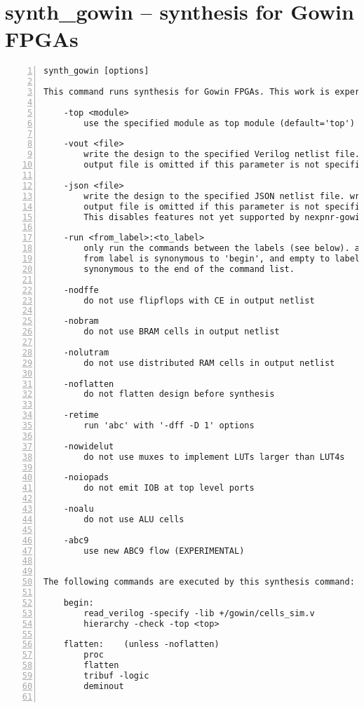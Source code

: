 \section{synth\_gowin -- synthesis for Gowin FPGAs}
\label{cmd:synth_gowin}
\begin{lstlisting}[numbers=left,frame=single]
    synth_gowin [options]

This command runs synthesis for Gowin FPGAs. This work is experimental.

    -top <module>
        use the specified module as top module (default='top')

    -vout <file>
        write the design to the specified Verilog netlist file. writing of an
        output file is omitted if this parameter is not specified.

    -json <file>
        write the design to the specified JSON netlist file. writing of an
        output file is omitted if this parameter is not specified.
        This disables features not yet supported by nexpnr-gowin.

    -run <from_label>:<to_label>
        only run the commands between the labels (see below). an empty
        from label is synonymous to 'begin', and empty to label is
        synonymous to the end of the command list.

    -nodffe
        do not use flipflops with CE in output netlist

    -nobram
        do not use BRAM cells in output netlist

    -nolutram
        do not use distributed RAM cells in output netlist

    -noflatten
        do not flatten design before synthesis

    -retime
        run 'abc' with '-dff -D 1' options

    -nowidelut
        do not use muxes to implement LUTs larger than LUT4s

    -noiopads
        do not emit IOB at top level ports

    -noalu
        do not use ALU cells

    -abc9
        use new ABC9 flow (EXPERIMENTAL)


The following commands are executed by this synthesis command:

    begin:
        read_verilog -specify -lib +/gowin/cells_sim.v
        hierarchy -check -top <top>

    flatten:    (unless -noflatten)
        proc
        flatten
        tribuf -logic
        deminout


\end{lstlisting}
